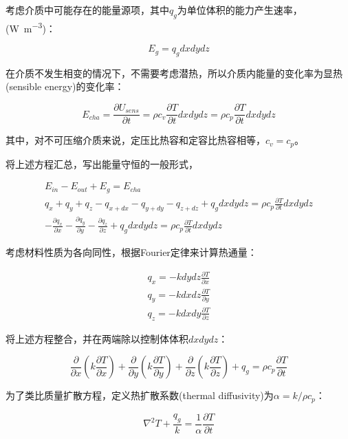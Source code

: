 考虑介质中可能存在的能量源项，其中$ q_g $为单位体积的能力产生速率，(\si{\watt\per\meter\cubed})：

\begin{equation}
E_g = q_g dxdydz
\end{equation}

在介质不发生相变的情况下，不需要考虑潜热，所以介质内能量的变化率为显热(sensible energy)的变化率：

\begin{equation}
E_{cha} = \frac{\partial U_{sens}}{\partial t} = \rho c_v \frac{\partial T}{\partial t}dxdydz = \rho c_p \frac{\partial T}{\partial t}dxdydz
\end{equation}

其中，对不可压缩介质来说，定压比热容和定容比热容相等，$ c_v=c_p $。

将上述方程汇总，写出能量守恒的一般形式，

\begin{gather}
E_{in} - E_{out} + E_g = E_{cha} \\
q_x + q_y + q_z - q_{x+dx} - q_{y+dy} - q_{z+dz} + q_g dxdydz = \rho c_p \frac{\partial T}{\partial t} dxdydz \\
-\frac{\partial q_x}{\partial x} -\frac{\partial q_y}{\partial y} -\frac{\partial q_z}{\partial z} + q_g dxdydz = \rho c_p \frac{\partial T}{\partial t} dxdydz
\end{gather}

考虑材料性质为各向同性，根据Fourier定律来计算热通量：

\begin{gather}
q_x = -k dydz \frac{\partial T}{\partial x} \\
q_y = -k dxdz \frac{\partial T}{\partial y} \\
q_z = -k dxdy \frac{\partial T}{\partial z}
\end{gather}

将上述方程整合，并在两端除以控制体体积$ dxdydz $：

\begin{equation}
\frac{\partial}{\partial x}\left(k\frac{\partial T}{\partial x}\right) + \frac{\partial}{\partial y}\left(k\frac{\partial T}{\partial y}\right) + \frac{\partial}{\partial z}\left(k\frac{\partial T}{\partial z}\right) + q_g = \rho c_p \frac{\partial T}{\partial t}
\end{equation}

为了类比质量扩散方程，定义热扩散系数(thermal diffusivity)为$ \alpha = k/\rho c_p $：

\begin{equation}
\nabla^2 T + \frac{q_g}{k} = \frac{1}{\alpha} \frac{\partial T}{\partial t}
\end{equation}

